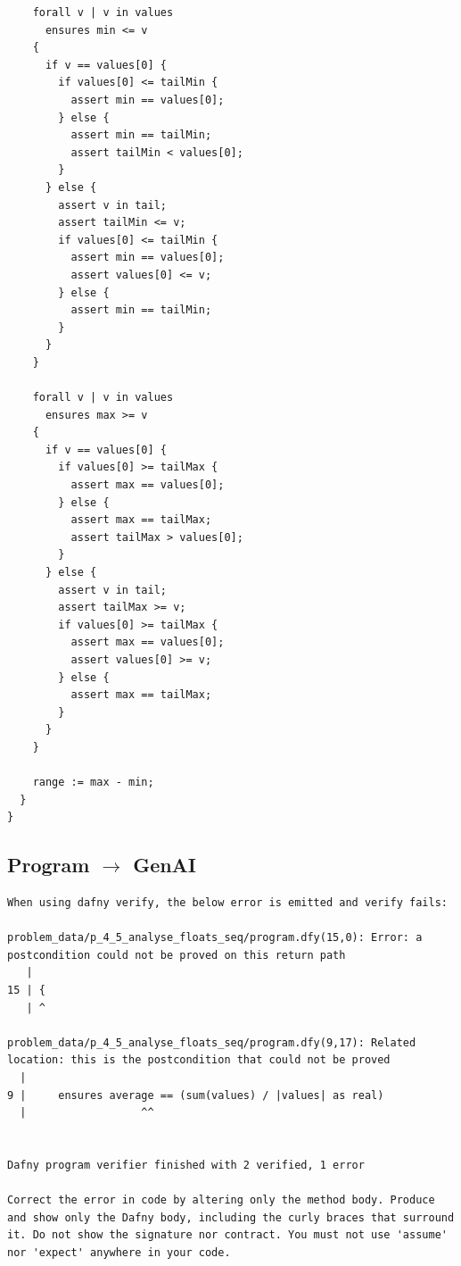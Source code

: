 \documentclass{article}
\begin{document}
\begin{lstlisting}
    forall v | v in values
      ensures min <= v
    {
      if v == values[0] {
        if values[0] <= tailMin {
          assert min == values[0];
        } else {
          assert min == tailMin;
          assert tailMin < values[0];
        }
      } else {
        assert v in tail;
        assert tailMin <= v;
        if values[0] <= tailMin {
          assert min == values[0];
          assert values[0] <= v;
        } else {
          assert min == tailMin;
        }
      }
    }

    forall v | v in values
      ensures max >= v
    {
      if v == values[0] {
        if values[0] >= tailMax {
          assert max == values[0];
        } else {
          assert max == tailMax;
          assert tailMax > values[0];
        }
      } else {
        assert v in tail;
        assert tailMax >= v;
        if values[0] >= tailMax {
          assert max == values[0];
          assert values[0] >= v;
        } else {
          assert max == tailMax;
        }
      }
    }

    range := max - min;
  }
}
\end{lstlisting}
\subsection*{Program $\rightarrow$ GenAI}
\begin{lstlisting}
When using dafny verify, the below error is emitted and verify fails:

problem_data/p_4_5_analyse_floats_seq/program.dfy(15,0): Error: a postcondition could not be proved on this return path
   |
15 | {
   | ^

problem_data/p_4_5_analyse_floats_seq/program.dfy(9,17): Related location: this is the postcondition that could not be proved
  |
9 | 	ensures average == (sum(values) / |values| as real)
  |                  ^^


Dafny program verifier finished with 2 verified, 1 error

Correct the error in code by altering only the method body. Produce and show only the Dafny body, including the curly braces that surround it. Do not show the signature nor contract. You must not use 'assume' nor 'expect' anywhere in your code.
\end{lstlisting}
\end{document}
